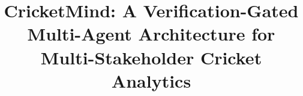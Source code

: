 
\title{CricketMind: A Verification-Gated Multi-Agent Architecture for Multi-Stakeholder Cricket Analytics}


\maketitle
